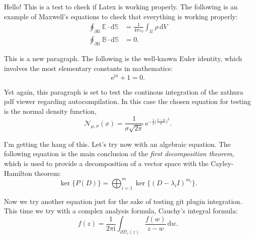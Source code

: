 \documentclass{article}
\begin{document}
Hello! This is a test to check if Latex is working properly. The following is
an example of Maxwell's equations to check that everything is working properly:
\begin{align}
    \oint_{\partial \mathcal{U}} \mathbb{E} \cdot \mathrm{d} \mathbb{S} &= \frac{1}{4 \pi \varepsilon_0}
    \int_{\mathcal{U}} \rho \, \mathrm{d} V \\
    \oint_{\partial \mathcal{U}} \mathbb{B} \cdot \mathrm{d} \mathbb{S} &= 0.
\end{align}

This is a new paragraph. The following is the well-known Euler identity, which
involves the most elementary constants in mathematics:
\begin{equation}
    \mathrm{e}^{\mathrm{i} \pi} + 1 = 0.
\end{equation}

Yet again, this paragraph is set to test the continous integration of the
zathura pdf viewer regarding autocompilation. In this case the chosen equation 
for testing is the normal density function,
\begin{equation}
    \mathcal{N}_{\mu, \sigma}(x) = \frac{1}{\sigma \sqrt{2 \pi}} \, \mathrm{e}^{- \frac{1}{2} \big( \frac{x - \mu}{\sigma} \big)^2}.
\end{equation}

I'm getting the hang of this. Let's try now with an algebraic equation. The
following equation is the main conclusion of the \emph{first decomposition
theorem}, which is used to provide a decomposition of a vector space with the
Cayley-Hamilton theorem:
\begin{equation}
    \ker\big\{ P(D) \big\} = \bigoplus_{i = 1}^{m} \ker \big\{ (D - \lambda_{i} I)^{m_i} \big\}.
\end{equation}

Now we try another equation just for the sake of testing git plugin integration.
This time we try with a complex analysis formula, Cauchy's integral formula:
\begin{equation}
    f(z) = \frac{1}{2 \pi \mathrm{i}} \int_{\partial \mathcal{D}_{\varepsilon}(z)}
    \frac{f(w)}{z - w} \, \mathrm{d}w.
\end{equation}
\end{document}
